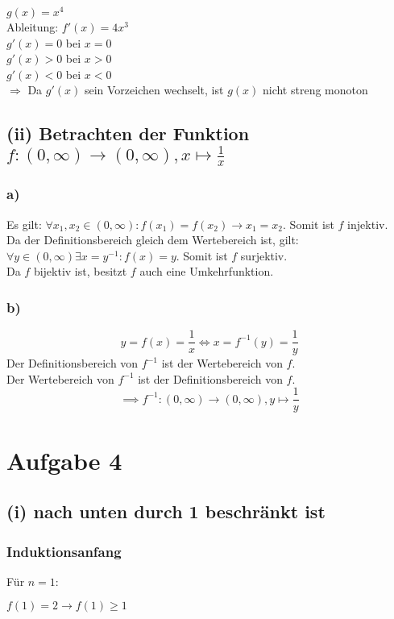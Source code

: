 \documentclass{article}
\begin{document}
\begin{center}
$g(x)=x^4$ \\
Ableitung: $f'(x)=4x^3$ \\
$g'(x) = 0$ bei $x=0$ \\
$g'(x) > 0$ bei $x > 0$ \\
$g'(x) < 0$ bei $x < 0$ \\
$\Longrightarrow$ Da $g'(x)$ sein Vorzeichen wechselt, ist $g(x)$ nicht streng monoton
\end{center}

\subsection{(ii) Betrachten der Funktion $f:(0,\infty)\xrightarrow{}(0,\infty), x \mapsto \frac{1}{x}$}
\subsubsection{a)}
Es gilt: $\forall x_1, x_2 \in (0, \infty): f(x_1) = f(x_2) \to x_1 = x_2$. Somit ist $f$ injektiv. \\ 
Da der Definitionsbereich gleich dem Wertebereich ist, gilt: $\forall y \in (0,\infty) \exists x = y^{-1}: f(x) = y$. Somit ist $f$ surjektiv. \\
Da $f$ bijektiv ist, besitzt $f$ auch eine Umkehrfunktion.

\subsubsection{b)}
\[y = f(x) = \frac{1}{x} \Longleftrightarrow x = f^{-1}(y) = \frac{1}{y}\]
Der Definitionsbereich von $f^{-1}$ ist der Wertebereich von $f$. \\
Der Wertebereich von $f^{-1}$ ist der Definitionsbereich von $f$. \\
\[\implies f^{-1}: (0,\infty) \to (0, \infty), y \mapsto \frac{1}{y}\]

\section{Aufgabe 4}
\subsection{(i) nach unten durch 1 beschränkt ist}
\subsubsection{Induktionsanfang}
Für $n = 1$:
\begin{center}
    $f(1) = 2 \longrightarrow f(1) \geq 1$
\end{center}
\end{document}
